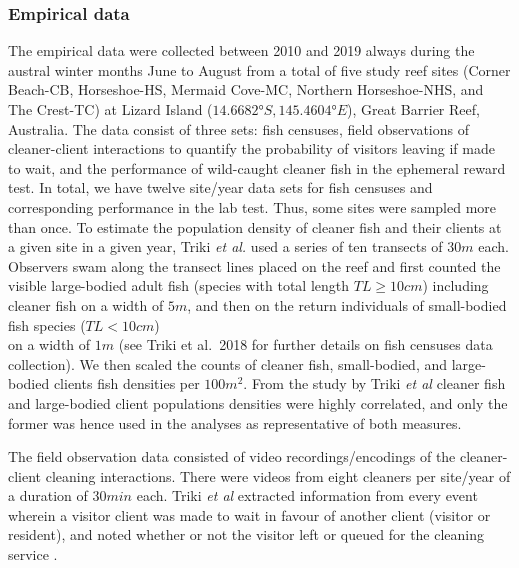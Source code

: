 \documentclass[]{rsos}%
\begin{document}
\hypertarget{empirical-data}{%
\subsubsection{Empirical data}\label{empirical-data}}

The empirical data were collected between 2010 and 2019 always during
the austral winter months June to August from a total of five
study reef sites (Corner Beach-CB, Horseshoe-HS, Mermaid Cove-MC,
Northern Horseshoe-NHS, and The Crest-TC) at Lizard Island
(\(14.6682° S, 145.4604° E\)), Great Barrier Reef, Australia.
The data consist of three sets: fish censuses, field
observations of cleaner-client interactions to quantify the probability
of visitors leaving if made to wait, and the
performance of wild-caught cleaner fish in the ephemeral reward test.
In total, we have twelve site/year data sets for fish censuses and
corresponding performance in the lab test. Thus, some sites were sampled more
than once. To estimate the population density of cleaner fish
and their clients at a given site in
a given year, Triki \emph{et al.} \citep{triki_Biological_2019} used a series of ten
transects of \(30m\) each. Observers swam along the transect lines placed on
the reef and first counted the visible large-bodied adult fish
(species with total length \(TL \geq 10cm\)) including cleaner fish
on a width of \(5m\), and then on the
return individuals of small-bodied fish species (\(TL < 10 cm\))\\
on a width of \(1 m\)
(see Triki et al.~2018 for further details on fish censuses data collection).
We then scaled the counts of cleaner fish, small-bodied,
and large-bodied clients fish densities per \(100 m^2\).
From the study by Triki \emph{et al} \citep{triki_Biological_2019}
cleaner fish and large-bodied client populations densities were
highly correlated, and only the former
was hence used in the analyses as representative of both measures.

The field observation data consisted of video recordings/encodings of the
cleaner-client cleaning interactions. There were videos from eight
cleaners per site/year of a duration of \(30 min\) each. Triki \emph{et al}
extracted information from every event wherein a visitor client
was made to wait in favour of another client (visitor or resident), and noted
whether or not the visitor left or queued for the cleaning service
\citep{triki_Biological_2019, triki_Brain_2020}.
\end{document}
